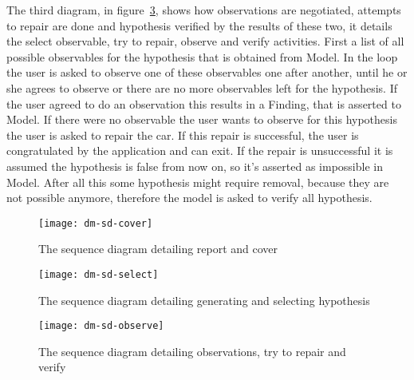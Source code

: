 The third diagram, in figure~\ref{fig:dm:sd observe}, shows how observations are
negotiated, attempts to repair are done and hypothesis verified by the
results of these two, it details the select observable, try to repair, observe
and verify activities. First a list of all  possible observables for the
hypothesis that is obtained from Model. In the loop the user is asked to observe one of
these observables one after another, until he or she agrees to observe or there
are no more observables left for the hypothesis. If the user agreed to do an
observation this results in a Finding, that is asserted to Model. If there were
no observable the user wants to observe for this hypothesis the user is asked to
repair the car. If this repair is successful, the user is congratulated by the
application and can exit. If the repair is unsuccessful it is assumed the
hypothesis is false from now on, so it's asserted as impossible in Model. After
all this some hypothesis might require removal, because they are not possible
anymore, therefore the model is asked to verify all hypothesis.

\begin{figure}[htbp]
    \centering
    \texttt{[image: dm-sd-cover]}
    \caption{The sequence diagram detailing report and cover}
    \label{fig:dm:sd cover}
\end{figure}

\begin{figure}[htbp]
    \centering
    \texttt{[image: dm-sd-select]}
    \caption{The sequence diagram detailing generating and selecting hypothesis}
    \label{fig:dm:sd select}
\end{figure}

\begin{figure}[htbp]
    \centering
    \texttt{[image: dm-sd-observe]}
    \caption{The sequence diagram detailing observations, try to repair and verify}
    \label{fig:dm:sd observe}
\end{figure}
